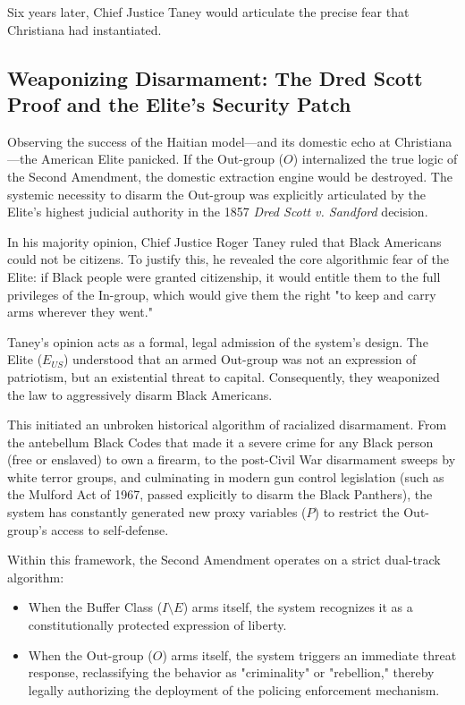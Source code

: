 \documentclass[12pt,openany]{book}
\begin{document}
Six years later, Chief Justice Taney would articulate the precise fear that Christiana had instantiated.

\subsection{Weaponizing Disarmament: The Dred Scott Proof and the Elite’s Security Patch}
Observing the success of the Haitian model---and its domestic echo at Christiana---the American Elite panicked. If the Out-group ($O$) internalized the true logic of the Second Amendment, the domestic extraction engine would be destroyed. The systemic necessity to disarm the Out-group was explicitly articulated by the Elite's highest judicial authority in the 1857 \textit{Dred Scott v. Sandford} decision.

In his majority opinion, Chief Justice Roger Taney ruled that Black Americans could not be citizens. To justify this, he revealed the core algorithmic fear of the Elite: if Black people were granted citizenship, it would entitle them to the full privileges of the In-group, which would give them the right "to keep and carry arms wherever they went."

Taney’s opinion acts as a formal, legal admission of the system's design. The Elite ($E_{US}$) understood that an armed Out-group was not an expression of patriotism, but an existential threat to capital. Consequently, they weaponized the law to aggressively disarm Black Americans.

This initiated an unbroken historical algorithm of racialized disarmament. From the antebellum Black Codes that made it a severe crime for any Black person (free or enslaved) to own a firearm, to the post-Civil War disarmament sweeps by white terror groups, and culminating in modern gun control legislation (such as the Mulford Act of 1967, passed explicitly to disarm the Black Panthers), the system has constantly generated new proxy variables ($P$) to restrict the Out-group's access to self-defense.

Within this framework, the Second Amendment operates on a strict dual-track algorithm:
\begin{itemize}
    \item When the Buffer Class ($I \setminus E$) arms itself, the system recognizes it as a constitutionally protected expression of liberty.
    \item When the Out-group ($O$) arms itself, the system triggers an immediate threat response, reclassifying the behavior as "criminality" or "rebellion," thereby legally authorizing the deployment of the policing enforcement mechanism.
\end{itemize}
\end{document}
